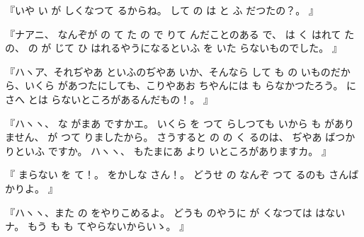 
『いや
い
が
しくなつて
るからね。
して
の
は
と
ふ
だつたの？。
』

『ナアニ、
なんぞが
の
て
た
の
で
りて
んだことのある
で、
は
く
はれて
た
の、
の
が
じて
ひ
はれるやうになるといふ
を
いた
らないものでした。
』

『ハヽア、それぢやあ
といふのぢやあ
いか、そんなら
して
も
の
いものだから、いくら
があつたにしても、こりやあお
ちやんには
も
らなかつたろう。
にさへ
とは
らないところがあるんだもの！。
』

『ハヽヽ、
な
がまあ
ですかエ。
いくら
を
つて
らしつても
いから
も
がありません、
が
つて
りましたから。
さうすると
の
の
く
るのは、
ぢやあ
ばつかりといふ
ですか。
ハヽヽ、
もたまにあ
より
いところがありますカ。
』

『
まらない
を
て！。
をかしな
さん！。
どうせ
の
なんぞ
つて
るのも
さんばかりよ。
』

『ハヽヽ、また
の
をやりこめるよ。
どうも
のやうに
が
くなつては
はないナ。
もう
も
も
てやらないからいゝ。
』

